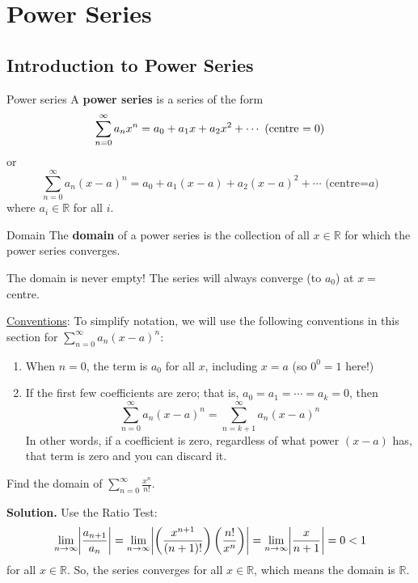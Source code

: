 \chapter{Power Series}
\section{Introduction to Power Series}
\begin{Definition}{Power series}{}
    A \textbf{power series} is a series of the form
    \[ \sum\limits_{n=0}^{\infty} a_n x^n=a_0+a_1x+a_2x^2+\cdots\text{ (centre $ =0$)} \]
    or
    \[ \sum\limits_{n=0}^{\infty} a_n (x-a)^n=a_0+a_1(x-a)+a_2(x-a)^2+\cdots\text{ (centre=$a$)} \]
    where $ a_i\in\mathbb{R} $ for all $ i $.
\end{Definition}
\begin{Definition}{Domain}{}
    The \textbf{domain} of a power series is the collection of all
    $ x\in\mathbb{R} $ for which the power series converges.
\end{Definition}

\begin{Remark}{}{}
    The domain is never empty! The series will always converge (to $ a_0 $)
    at $ x= $ centre.
\end{Remark}
\underline{Conventions}: To simplify notation, we will use the following
conventions in this section for $ \sum\limits_{n=0}^{\infty} a_n(x-a)^n $:
\begin{enumerate}[label=(\Roman*)]
    \item When $ n=0 $, the term is $ a_0 $ for all $ x $, including $ x=a $
          (so $ 0^0=1 $ here!)
    \item If the first few coefficients are zero; that is, $ a_0=a_1=\cdots=a_k=0 $,
          then
          \[ \sum\limits_{n=0}^{\infty} a_n(x-a)^n=\sum\limits_{n=k+1}^{\infty} a_n(x-a)^n \]
          In other words, if a coefficient is zero, regardless of what power
          $ (x-a) $ has, that term is zero and you can discard it.
\end{enumerate}

\begin{Example}{}{}
    Find the domain of $ \displaystyle \sum\limits_{n=0}^{\infty} \frac{x^n}{n!} $.

    \textbf{Solution.} Use the Ratio Test:
    \[ \lim\limits_{{n} \to {\infty}} \abs*{\frac{a_{n+1}}{a_n}}
        =\lim\limits_{{n} \to {\infty}} \abs*{\left( \frac{x^{n+1}}{(n+1)!} \right)
            \left( \frac{n!}{x^n} \right)}
        =\lim\limits_{{n} \to {\infty}} \abs*{\frac{x}{n+1}}
        =0
        <1 \]
    for all $ x\in\mathbb{R} $. So, the series converges for all $ x\in\mathbb{R} $,
    which means the domain is $ \mathbb{R} $.
\end{Example}

